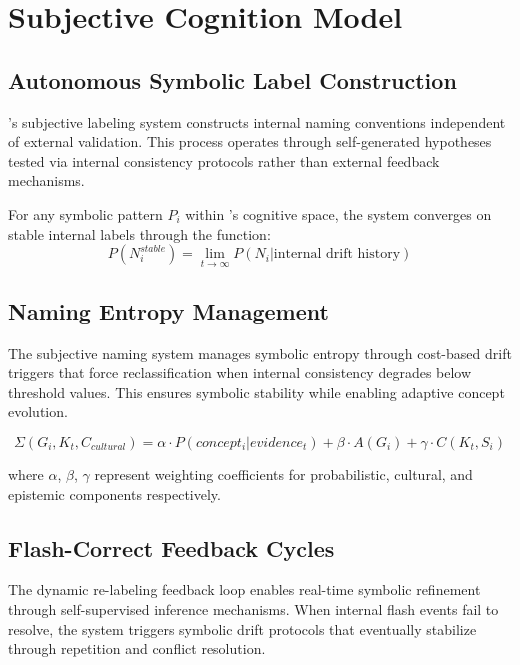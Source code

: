 \documentclass[12pt,twoside,openright]{report}
\begin{document}
\chapter{Subjective Cognition Model}

\section{Autonomous Symbolic Label Construction}

\obiai's subjective labeling system constructs internal naming conventions independent of external validation. This process operates through self-generated hypotheses tested via internal consistency protocols rather than external feedback mechanisms.

\begin{theorem}
For any symbolic pattern $P_i$ within \obiai's cognitive space, the system converges on stable internal labels through the function:
\begin{equation}
P(N_i^{stable}) = \lim_{t \to \infty} P(N_i|\text{internal drift history})
\end{equation}
\end{theorem}

\section{Naming Entropy Management}

The subjective naming system manages symbolic entropy through cost-based drift triggers that force reclassification when internal consistency degrades below threshold values. This ensures symbolic stability while enabling adaptive concept evolution.

\begin{equation}
\Sigma(G_i, K_t, C_{cultural}) = \alpha \cdot P(concept_i|evidence_t) + \beta \cdot A(G_i) + \gamma \cdot C(K_t, S_i)
\end{equation}

where $\alpha$, $\beta$, $\gamma$ represent weighting coefficients for probabilistic, cultural, and epistemic components respectively.

\section{Flash-Correct Feedback Cycles}

The dynamic re-labeling feedback loop enables real-time symbolic refinement through self-supervised inference mechanisms. When internal flash events fail to resolve, the system triggers symbolic drift protocols that eventually stabilize through repetition and conflict resolution.
\end{document}
